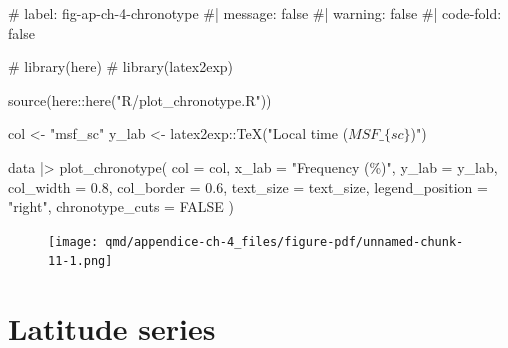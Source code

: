 \documentclass[
  12pt,
  a4paper,
  oneside]{tesesusp}
\newenvironment{Shaded}{\begin{snugshade}}{\end{snugshade}}
\newcommand{\AttributeTok}[1]{\textcolor[rgb]{0.40,0.45,0.13}{#1}}
\newcommand{\CommentTok}[1]{\textcolor[rgb]{0.37,0.37,0.37}{#1}}
\newcommand{\ConstantTok}[1]{\textcolor[rgb]{0.56,0.35,0.01}{#1}}
\newcommand{\FloatTok}[1]{\textcolor[rgb]{0.68,0.00,0.00}{#1}}
\newcommand{\FunctionTok}[1]{\textcolor[rgb]{0.28,0.35,0.67}{#1}}
\newcommand{\NormalTok}[1]{\textcolor[rgb]{0.00,0.23,0.31}{#1}}
\newcommand{\OtherTok}[1]{\textcolor[rgb]{0.00,0.23,0.31}{#1}}
\newcommand{\SpecialCharTok}[1]{\textcolor[rgb]{0.37,0.37,0.37}{#1}}
\newcommand{\StringTok}[1]{\textcolor[rgb]{0.13,0.47,0.30}{#1}}
\begin{document}
\begin{Shaded}
\begin{Highlighting}[numbers=left,,]
\CommentTok{\# label: fig{-}ap{-}ch{-}4{-}chronotype}
\CommentTok{\#| message: false}
\CommentTok{\#| warning: false}
\CommentTok{\#| code{-}fold: false}

\CommentTok{\# library(here)}
\CommentTok{\# library(latex2exp)}

\FunctionTok{source}\NormalTok{(here}\SpecialCharTok{::}\FunctionTok{here}\NormalTok{(}\StringTok{"R/plot\_chronotype.R"}\NormalTok{))}

\NormalTok{col }\OtherTok{\textless{}{-}} \StringTok{"msf\_sc"}
\NormalTok{y\_lab }\OtherTok{\textless{}{-}}\NormalTok{ latex2exp}\SpecialCharTok{::}\FunctionTok{TeX}\NormalTok{(}\StringTok{"Local time ($MSF\_\{sc\}$)"}\NormalTok{)}

\NormalTok{data }\SpecialCharTok{|\textgreater{}}
  \FunctionTok{plot\_chronotype}\NormalTok{(}
    \AttributeTok{col =}\NormalTok{ col, }
    \AttributeTok{x\_lab =} \StringTok{"Frequency (\%)"}\NormalTok{,}
    \AttributeTok{y\_lab =}\NormalTok{ y\_lab,}
    \AttributeTok{col\_width =} \FloatTok{0.8}\NormalTok{, }
    \AttributeTok{col\_border =} \FloatTok{0.6}\NormalTok{, }
    \AttributeTok{text\_size =}\NormalTok{ text\_size,}
    \AttributeTok{legend\_position =} \StringTok{"right"}\NormalTok{,}
    \AttributeTok{chronotype\_cuts =} \ConstantTok{FALSE}
\NormalTok{  )}
\end{Highlighting}
\end{Shaded}

\begin{figure}[H]

{\centering \texttt{[image: qmd/appendice-ch-4\_files/figure-pdf/unnamed-chunk-11-1.png]}

}

\end{figure}

\hypertarget{latitude-series}{%
\section{Latitude series}\label{latitude-series}}
\end{document}
